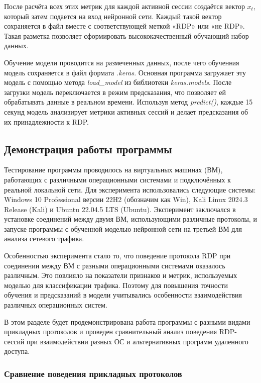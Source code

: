 \documentclass[bachelor, och, coursework]{SCWorks}
\begin{document}
После расчёта всех этих метрик для каждой активной сессии создаётся вектор $x_t$, который затем подается на вход нейронной сети. 
Каждый такой вектор сохраняется в файл вместе с соответствующей меткой «RDP» или «не RDP». Такая разметка позволяет сформировать 
высококачественный обучающий набор данных.

Обучение модели проводится на размеченных данных, после чего обученная модель сохраняется в файл формата \textit{.keras}. Основная программа 
загружает эту модель с помощью метода \textit{load_model} из библиотеки \textit{keras.models}. После загрузки модель переключается в 
режим предсказания, что позволяет ей обрабатывать данные в реальном времени. Используя метод \textit{predict()}, каждые 15 секунд модель 
анализирует метрики активных сессий и делает предсказания об их принадлежности к RDP.  

\subsection{Демонстрация работы программы}

Тестирование программы проводилось на виртуальных машинах (ВМ), работающих с различными операционными системами и подключённых к реальной локальной сети. 
Для эксперимента использовались следующие системы: Windows 10 Professional версии 22H2 (обозначим как Win), Kali Linux 2024.3 Release (Kali) и 
Ubuntu 22.04.5 LTS (Ubuntu). Эксперимент заключался в установке соединений между двумя ВМ, использующими различные протоколы, и запуске программы 
с обученной моделью нейронной сети на третьей ВМ для анализа сетевого трафика.

Особенностью эксперимента стало то, что поведение протокола RDP при соединении между ВМ с разными операционными системами оказалось различным. Это 
повлияло на показатели признаков и метрик, используемых моделью для классификации трафика. Поэтому для повышения точности обучения и предсказаний в 
модели учитывались особенности взаимодействия различных операционных систем.

В этом разделе будет продемонстрирована работа программы с разными видами прикладных протоколов и проведен сравнительный анализ поведения RDP-сессий 
при взаимодействии разных ОС и альтернативных программ удаленного доступа.

\subsubsection{Сравнение поведения прикладных протоколов}
\end{document}
